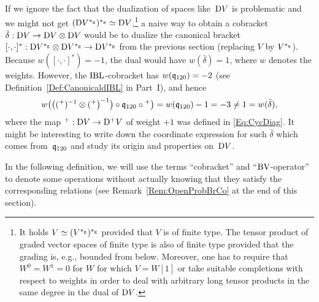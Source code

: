 \documentclass[\MainFolder/Text.tex]{subfiles}
\begin{document}
\begin{Remark}
If we ignore the fact that the dualization of spaces like~$\mathrm{D} V$ is problematic and we might not get $(\mathrm{D} V^{*_{\mathrm{g}}})^{*_{\mathrm{g}}}\simeq \mathrm{D} V$,\footnote{It holds $V\simeq (V^{*_{\mathrm{g}}})^{*_{\mathrm{g}}}$ provided that $V$ is of finite type. The tensor product of graded vector spaces of finite type is also of finite type provided that the grading is, e.g., bounded from below. Moreover, one has to require that $W^0 =W^1=0$ for $W$ for which $V=W[1]$ or take suitable completions with respect to weights in order to deal with arbitrary long tensor products in the same degree in the dual of $\mathrm{D} V$.} a naive way to obtain a cobracket $\bar{\delta}: \mathrm{D} V\rightarrow\mathrm{D} V \otimes\mathrm{D} V$ would be to dualize the  canonical bracket $[\cdot,\cdot]^*: \mathrm{D} V^{*_{\mathrm{g}}} \otimes \mathrm{D} V^{*_{\mathrm{g}}} \rightarrow \mathrm{D} V^{*_{\mathrm{g}}}$ from the previous section (replacing $V$ by $V^{*_{\mathrm{g}}}$). Because $w([\cdot,\cdot]^*) = -1$, the dual would have $w(\bar{\delta}) = 1$, where $w$ denotes the weights. However, the $\mathrm{IBL}$-cobracket has $w(\mathfrak{q}_{120})=-2$ (see Definition~\ref{Def:CanonicaldIBL} in Part~I), and hence 
$$w\bigl(\bigl(({}^+)^{-1}\otimes({}^+\bigr)^{-1}\bigr)\circ\mathfrak{q}_{120}\circ{}^+\bigr) = w(\mathfrak{q}_{120}) - 1 = - 3 \neq 1 = w(\bar{\delta}), $$
where the map ${}^+: \mathrm{D} V\rightarrow\mathrm{D}^+ V$ of weight $+1$ was defined in \eqref{Eq:CycDiag}. It might be interesting to write down the coordinate expression for such $\bar{\delta}$ which comes from~$\mathfrak{q}_{120}$ and study its origin and properties on~$\mathrm{D} V$.
\end{Remark}

In the following definition, we will use the terms ``cobracket'' and ``$\mathrm{BV}$-operator'' to denote some operations without actually knowing that they satisfy the corresponding relations (see Remark~\ref{Rem:OpenProbBrCo} at the end of this section).
 
\end{document}
